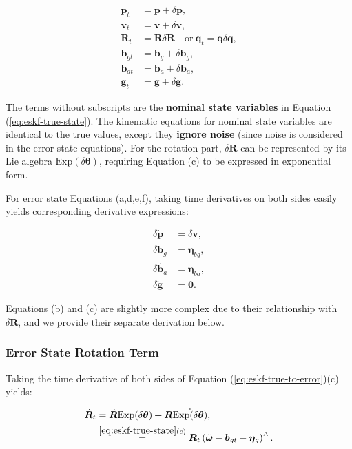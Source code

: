 \begin{subequations}\label{eq:eskf-true-to-error}
	\begin{align}
		\bm{p}_t &= \bm{p} + \delta \bm{p}, \\
		\bm{v}_t &= \bm{v} + \delta \bm{v}, \\
		\bm{R}_t &= \bm{R} \delta \bm{R} \quad \text{or} \ \bm{q}_t = \bm{q} \delta \bm{q}, \\
		\bm{b}_{gt} &= \bm{b}_g + \delta \bm{b}_g, \\
		\bm{b}_{at} &= \bm{b}_a + \delta \bm{b}_a, \\
		\bm{g}_t &= \bm{g} + \delta \bm{g}.
	\end{align}
\end{subequations}

The terms without subscripts are the \textbf{nominal state variables} in Equation (\ref{eq:eskf-true-state}). The kinematic equations for nominal state variables are identical to the true values, except they \textbf{ignore noise} (since noise is considered in the error state equations). For the rotation part, $\delta \bm{R}$ can be represented by its Lie algebra $\mathrm{Exp}(\delta \boldsymbol{\theta})$, requiring Equation (c) to be expressed in exponential form.

For error state Equations (a,d,e,f), taking time derivatives on both sides easily yields corresponding derivative expressions:

\begin{subequations}
	\begin{align}
		\delta \dot{\bm{p}} &= \delta \bm{v}, \\
		\delta \dot{\bm{b}_g} &= \boldsymbol{\eta}_{bg}, \\
		\delta \dot{\bm{b}_a} &= \boldsymbol{\eta}_{ba}, \\
		\delta \dot{\bm{g}} &= \bm{0}.
	\end{align}
\end{subequations}

Equations (b) and (c) are slightly more complex due to their relationship with $\delta \bm{R}$, and we provide their separate derivation below.

\subsubsection{Error State Rotation Term}
Taking the time derivative of both sides of Equation (\ref{eq:eskf-true-to-error})(c) yields:

\begin{equation}\label{eq:eskf-3.19}
	\begin{aligned}
		\dot{\bm{R}}_t &= \dot{\bm{R}} \mathrm{Exp} (\delta \boldsymbol{\theta}) + \bm{R} 
		\dot{\mathrm{Exp}(\delta \boldsymbol{\theta})},  \\
		&\buildrel{\ref{eq:eskf-true-state}(c)}\over=  \bm{R}_t \left( \tilde{\boldsymbol{\omega}} - 
		\bm{b}_{gt} - \boldsymbol{\eta}_g \right) ^\wedge.
	\end{aligned}
\end{equation}

